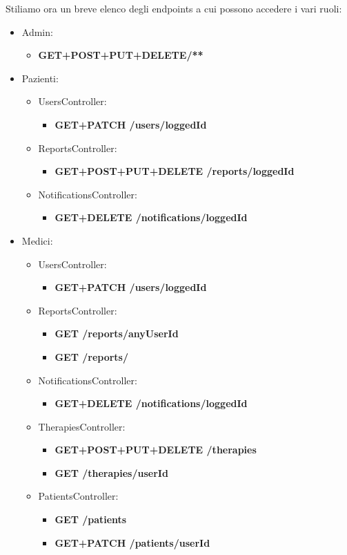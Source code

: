 \documentclass[a4paper]{article}
\begin{document}
Stiliamo ora un breve elenco degli endpoints a cui possono accedere i vari ruoli:
\begin{itemize}
  \item Admin:
  \begin{itemize}
    \item \textbf{GET+POST+PUT+DELETE/**}
  \end{itemize}
  \item Pazienti:
  \begin{itemize}
    \item UsersController: 
    \begin{itemize}
      \item \textbf{GET+PATCH /users/{loggedId}}
    \end{itemize}
    \item ReportsController: \begin{itemize}
      \item \textbf{GET+POST+PUT+DELETE /reports/{loggedId}}
    \end{itemize}
    \item NotificationsController: 
    \begin{itemize}
      \item \textbf{GET+DELETE /notifications/{loggedId}}
    \end{itemize}
  \end{itemize}
  \item Medici:
  \begin{itemize}
    \item UsersController:
    \begin{itemize}
      \item \textbf{GET+PATCH /users/{loggedId}} 
    \end{itemize}
    \item ReportsController:
    \begin{itemize}
      \item \textbf{GET /reports/{anyUserId}}
      \item \textbf{GET /reports/}
    \end{itemize}
    \item NotificationsController:
    \begin{itemize}
      \item \textbf{GET+DELETE /notifications/{loggedId}}
    \end{itemize}
    \item TherapiesController:
    \begin{itemize}
      \item \textbf{GET+POST+PUT+DELETE /therapies}
      \item \textbf{GET /therapies/{userId}}
    \end{itemize}
    \item PatientsController:
    \begin{itemize}
      \item \textbf{GET /patients}
      \item \textbf{GET+PATCH /patients/{userId}}
    \end{itemize}
  \end{itemize}
\end{itemize}
\end{document}

